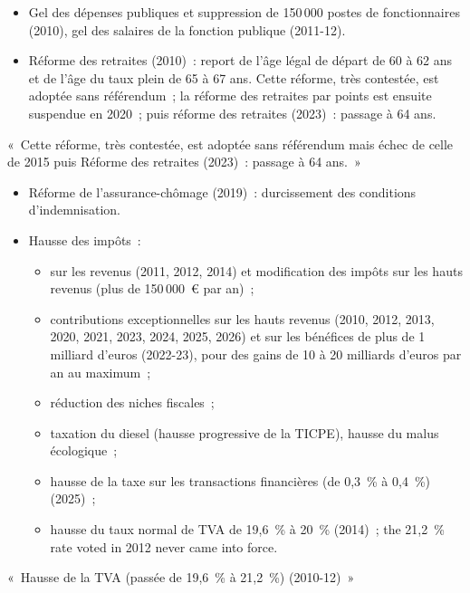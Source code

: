 \begin{itemize}
  \item Gel des dépenses publiques et suppression de 150\,000 postes de fonctionnaires
    (2010), gel des salaires de la fonction publique (2011-12).
  \item Réforme des retraites (2010)~: report de l'âge légal de départ de 60 à 62 ans
    et de l'âge du taux plein de 65 à 67 ans. Cette réforme, très contestée, est
    adoptée sans référendum~; la réforme des retraites par points est ensuite suspendue
    en 2020~; puis réforme des retraites (2023)~: passage à 64 ans.
\end{itemize}

\begin{remark}
  «~Cette réforme, très contestée, est adoptée sans référendum mais échec de celle de
  2015 puis Réforme des retraites (2023)~: passage à 64 ans.~»
\end{remark}

\begin{itemize}
  \item Réforme de l'assurance-chômage (2019)~: durcissement des conditions
    d'indemnisation.
  \item Hausse des impôts~:
    \begin{itemize}
      \item sur les revenus (2011, 2012, 2014) et modification des impôts sur les hauts
        revenus (plus de 150\,000~€ par an)~;
      \item contributions exceptionnelles sur les hauts revenus (2010, 2012, 2013, 2020,
        2021, 2023, 2024, 2025, 2026) et sur les bénéfices de plus de 1 milliard d'euros
        (2022-23), pour des gains de 10 à 20 milliards d'euros par an au maximum~;
      \item réduction des niches fiscales~;
      \item taxation du diesel (hausse progressive de la TICPE), hausse du malus
        écologique~;
      \item hausse de la taxe sur les transactions financières (de 0,3~\% à 0,4~\%)
        (2025)~;
      \item hausse du taux normal de TVA de 19,6~\% à 20~\% (2014)~; the 21,2~\% rate
        voted in 2012 never came into force.
    \end{itemize}
\end{itemize}

\begin{remark}
  «~Hausse de la TVA (passée de 19,6~\% à 21,2~\%) (2010-12)~»
\end{remark}

